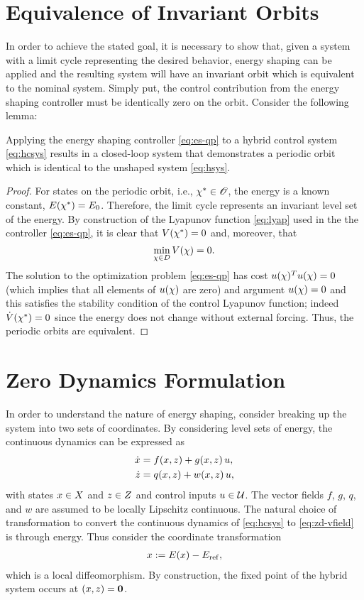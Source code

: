 \documentclass[twocolumn]{article}
\begin{document}
\section{Equivalence of Invariant Orbits}

In order to achieve the stated goal, it is necessary to show that, given a system with a limit cycle representing the desired behavior, energy shaping can be applied and the resulting system will have an invariant orbit which is equivalent to the nominal system. Simply put, the control contribution from the energy shaping controller must be identically zero on the orbit. Consider the following lemma:

\begin{lemma}
  Applying the energy shaping controller \eqref{eq:es-qp} to a hybrid control system \eqref{eq:hcsys} results in a closed-loop system that demonstrates a periodic orbit which is identical to the unshaped system \eqref{eq:hsys}.
\end{lemma}

\begin{proof}
  For states on the periodic orbit, i.e., $\chi^{*} \in \mathscr{O}$, the energy is a known constant, $E(\chi^{*}) = E_{0}$.
  Therefore, the limit cycle represents an invariant level set of the energy.
  By construction of the Lyapunov function \eqref{eq:lyap} used in the the controller \eqref{eq:es-qp}, it is clear that $V(\chi^{*}) = 0$ and, moreover, that $$\min_{\chi \in D} V(\chi) = 0.$$
  The solution to the optimization problem \eqref{eq:es-qp} has cost $u(\chi)^T u(\chi) = 0$ (which implies that all elements of $u(\chi)$ are zero) and argument $u(\chi) = 0$ and this satisfies the stability condition of the control Lyapunov function; indeed ${\dot V}(\chi^{*}) = 0$ since the energy does not change without external forcing.
  Thus, the periodic orbits are equivalent.
\end{proof}

\section{Zero Dynamics Formulation}

In order to understand the nature of energy shaping, consider breaking up the system into two sets of coordinates.
%
By considering level sets of energy, the continuous dynamics can be expressed as
\begin{align}
  \nonumber
  \dot {x} &= f(x, z) + g(x, z) \, u,\\
  \dot {z} &= q(x, z) + w(x, z) \, u,
  \label{eq:zd-vfield}
\end{align}
%
with states $x \in X$ and $z \in Z$ and control inputs $u \in \mathcal{U}$.
%
The vector fields $f$, $g$, $q$, and $w$ are assumed to be locally Lipschitz continuous.
%
The natural choice of transformation to convert the continuous dynamics of \eqref{eq:hcsys} to \eqref{eq:zd-vfield} is through energy.
%
Thus consider the coordinate transformation
\begin{align}
  x := E(x) - E_{\mathrm{ref}},
\end{align}
which is a local diffeomorphism.
%
By construction, the fixed point of the hybrid system occurs at $(x, z) = {\mathbf 0}$.
%
\end{document}
